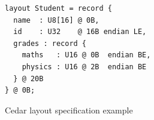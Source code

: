 \begin{figure}[h]
\centering
\begin{verbatim}
layout Student = record {
  name  : U8[16] @ 0B,
  id    : U32    @ 16B endian LE,
  grades : record {
    maths   : U16 @ 0B  endian BE,
    physics : U16 @ 2B  endian BE
  } @ 20B
} @ 0B;
\end{verbatim}
\caption*{Cedar layout specification example}
\label{fig:student-layout}
\end{figure}
